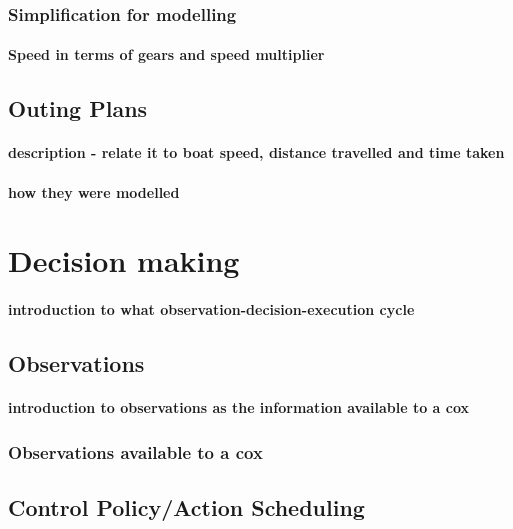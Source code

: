       \subsubsection{Simplification for modelling}
        \paragraph{Speed in terms of gears and speed multiplier}
        

    
    \subsection{Outing Plans}
      \paragraph{description - relate it to boat speed, distance travelled and time taken}
      \paragraph{how they were modelled}
    
  \section{Decision making}
    \paragraph{introduction to what observation-decision-execution cycle}

    \subsection{Observations}
      \paragraph{introduction to observations as the information available to a cox}
      
      \subsubsection{Observations available to a cox}
      
    \subsection{Control Policy/Action Scheduling}
